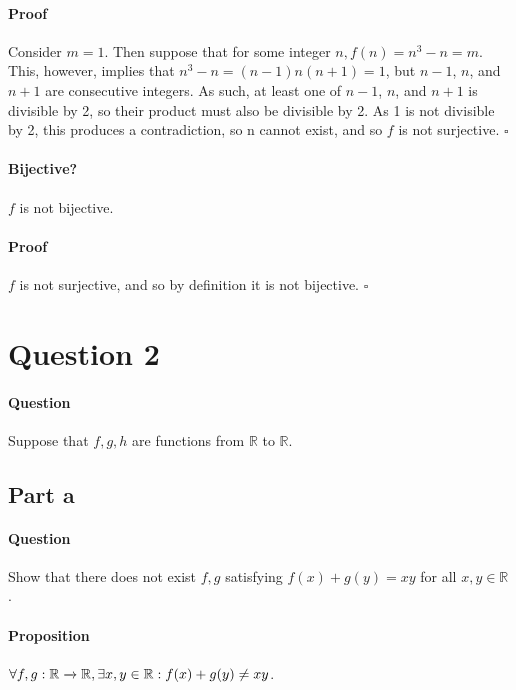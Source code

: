 \documentclass{article}
\begin{document}
{{	\paragraph{Proof}
	Consider $m=1$. Then suppose that for some integer $n, f(n) = n^3-n = m$. This, however, implies that $n^3-n = (n-1)n(n+1) = 1$, but $n-1$, $n$, and $n+1$ are consecutive integers. As such, at least one of $n-1$, $n$, and $n+1$ is divisible by 2, so their product must also be divisible by 2. As 1 is not divisible by 2, this produces a contradiction, so n cannot exist, and so $f$ is not surjective. $\square$
}
{
	\paragraph{Bijective?}
	$f$ is not bijective.
	\vspace{-10pt}
	\paragraph{Proof}
	$f$ is not surjective, and so by definition it is not bijective. $\square$
}
}
\pagebreak
\section{Question 2}
\paragraph{Question}
Suppose that $f, g, h$ are functions from $\mathbb{R}$ to $\mathbb{R}$.
\subsection{Part a}
\paragraph{Question}
Show that there does not exist $f,g$ satisfying $f(x) + g(y) = xy$ for all $x,y \in \mathbb{R}$.
\paragraph{Proposition} $\forall f,g: \mathbb{R}\xrightarrow{}\mathbb{R}, \exists x,y \in \mathbb{R} : f(x)+g(y)\neq xy$.
\vspace{-10pt}
\end{document}
